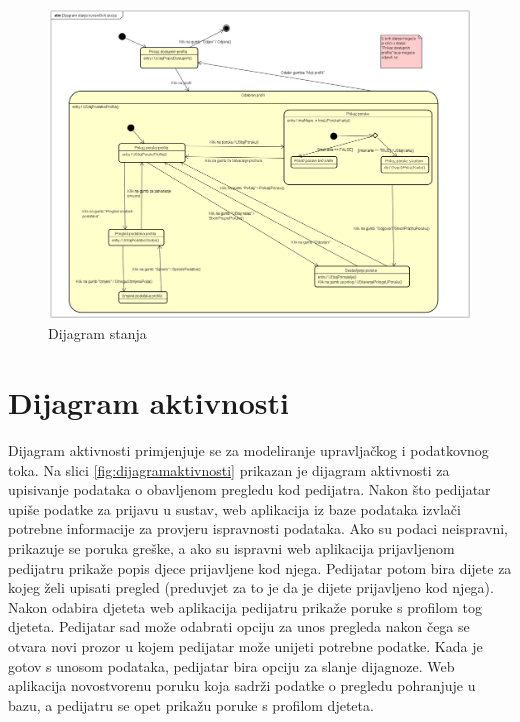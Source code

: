 			\begin{figure}[H]
				\includegraphics[width=\textwidth]{dijagrami/Dijagram stanja.PNG} %
				\caption{Dijagram stanja}
				\label{fig:dijagramstanja} %
			\end{figure}
			
			
			\eject 
		
		\section{Dijagram aktivnosti}
			
			 
			 Dijagram aktivnosti primjenjuje se za modeliranje upravljačkog i podatkovnog toka. Na slici \ref{fig:dijagramaktivnosti} prikazan je dijagram aktivnosti za upisivanje podataka o obavljenom pregledu kod pedijatra. Nakon što pedijatar upiše podatke za prijavu u sustav, web aplikacija iz baze podataka izvlači potrebne informacije za provjeru ispravnosti podataka. Ako su podaci neispravni, prikazuje se poruka greške, a ako su ispravni web aplikacija prijavljenom pedijatru prikaže popis djece prijavljene kod njega. Pedijatar potom bira dijete za kojeg želi upisati pregled (preduvjet za to je da je dijete prijavljeno kod njega). Nakon odabira djeteta web aplikacija pedijatru prikaže poruke s profilom tog djeteta. Pedijatar sad može odabrati opciju za unos pregleda nakon čega se otvara novi prozor u kojem pedijatar može unijeti potrebne podatke. Kada je gotov s unosom podataka, pedijatar bira opciju za slanje dijagnoze. Web aplikacija novostvorenu poruku koja sadrži podatke o pregledu pohranjuje u bazu, a pedijatru se opet prikažu poruke s profilom djeteta.
			 
